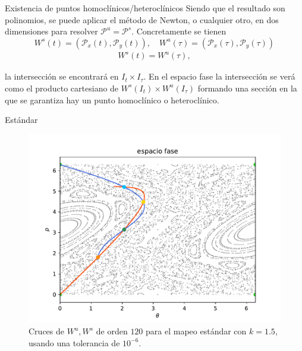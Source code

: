 \documentclass[11pt]{beamer}
\theoremstyle{definition}
\begin{document}
\begin{frame}{Existencia de puntos homocl\'inicos/heterocl\'inicos}
Siendo que el resultado son polinomios, se puede aplicar el método de Newton, o cualquier otro, en dos dimensiones para resolver $\mathcal{P}^{u}=\mathcal{P}^{s}$.
Concretamente se tienen \\
\begin{equation}
 W^{s}(t)=(\mathcal{P}_{x}(t),\mathcal{P}_{y}(t)) ,\quad W^{u}(\tau)=(\mathcal{P}_{x}(\tau),\mathcal{P}_{y}(\tau))
\end{equation}
\begin{eqnarray}
W^{s}(t)=W^{u}(\tau),
\end{eqnarray}

la intersección se encontrará en $I_{t}\times I_{\tau}$. En el espacio fase la intersección se verá como el producto cartesiano de $W^{s}(I_{t})\times W^{u}(I_{\tau})$ formando una sección en la que se garantiza hay un punto homoclínico o heteroclínico. 
\end{frame}
\begin{frame}{Est\'andar}
\begin{figure}
	\centering
	\includegraphics[scale=0.5]{cruce_estandar}
	\caption{Cruces de $W^{u},W^{s}$ de orden $120$ para el mapeo estándar con $k=1.5$, usando una tolerancia de $10^{-6}$.}
	\label{cruce_estandar}
\end{figure}

\end{frame}
\end{document}
